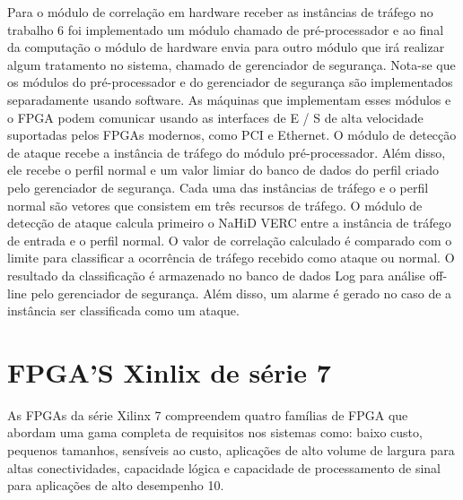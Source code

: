 Para o módulo de correlação em hardware receber as instâncias de tráfego no trabalho {6} foi implementado  um módulo  chamado de pré-processador e ao final da computação o módulo de hardware envia para outro módulo que irá realizar algum tratamento no sistema, chamado de gerenciador de segurança. Nota-se que os módulos do pré-processador e do gerenciador de segurança são implementados separadamente usando software. As máquinas que implementam esses módulos e o FPGA podem comunicar usando as interfaces de E / S de alta velocidade suportadas pelos FPGAs modernos, como PCI e Ethernet. O módulo de detecção de ataque recebe a instância	de tráfego do módulo pré-processador. Além disso, ele recebe o perfil normal e um valor limiar do banco de dados do perfil criado pelo gerenciador de segurança. Cada uma das instâncias de tráfego e o perfil normal são vetores que consistem em três recursos de tráfego. O módulo de detecção de ataque calcula primeiro o NaHiD VERC entre a instância de tráfego de entrada e o perfil normal. O valor de correlação calculado é comparado com o limite para classificar a ocorrência de tráfego recebido como ataque ou normal. O resultado da classificação é armazenado no banco de dados Log para análise off-line pelo gerenciador de segurança. Além disso, um alarme é gerado no caso de a instância ser classificada como um ataque.


\section{FPGA'S Xinlix de série 7}
As FPGAs da série Xilinx 7 compreendem quatro famílias de FPGA que abordam uma gama completa de requisitos nos sistemas como: baixo custo, pequenos tamanhos, sensíveis ao custo, aplicações de alto volume de largura para altas conectividades, capacidade lógica e capacidade de processamento de sinal para aplicações de alto desempenho {10}.

